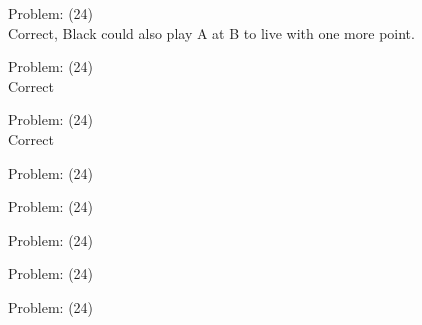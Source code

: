 \documentclass[11pt]{article}
\begin{document}
\begin{minipage}[t]{0.5\textwidth}
  {\centering
  
Problem: (24)\\
Correct, Black could also play A at B to live with one more point.\\
  }
\end{minipage}
\begin{minipage}[t]{0.5\textwidth}
  {\centering
  
Problem: (24)\\
Correct\\
  }
\end{minipage}
\begin{minipage}[t]{0.5\textwidth}
  {\centering
  
Problem: (24)\\
Correct\\
  }
\end{minipage}
\begin{minipage}[t]{0.5\textwidth}
  {\centering
  
Problem: (24)\\
  }
\end{minipage}
\begin{minipage}[t]{0.5\textwidth}
  {\centering
  
Problem: (24)\\
  }
\end{minipage}
\begin{minipage}[t]{0.5\textwidth}
  {\centering
  
Problem: (24)\\
  }
\end{minipage}
\begin{minipage}[t]{0.5\textwidth}
  {\centering
  
Problem: (24)\\
  }
\end{minipage}
\begin{minipage}[t]{0.5\textwidth}
  {\centering
  
Problem: (24)\\
  }
\end{minipage}
\end{document}
